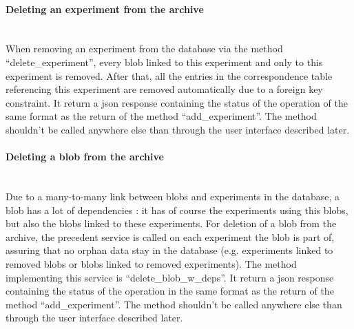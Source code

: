 \paragraph{Deleting an experiment from the archive} \hspace{0pt} \\
When removing an experiment from the database via the method ``delete\_experiment'', every blob linked to this experiment and only to this experiment is removed. After that, all the entries in the correspondence table referencing this experiment are removed automatically due to a foreign key constraint. It return a json response containing the status of the operation of the same format as the return of the method ``add\_experiment''. The method shouldn't be called anywhere else than through the user interface described later.

\paragraph{Deleting a blob from the archive} \hspace{0pt} \\
Due to a many-to-many link between blobs and experiments in the database, a blob has a lot of dependencies : it has of course the experiments using this blobs, but also the blobs linked to these experiments. For deletion of a blob from the archive, the precedent service is called on each experiment the blob is part of, assuring that no orphan data stay in the database (e.g. experiments linked to removed blobs or blobs linked to removed experiments). The method implementing this service is ``delete\_blob\_w\_deps''. It return a json response containing the status of the operation in the same format as the return of the method ``add\_experiment''. The method shouldn't be called anywhere else than through the user interface described later.

